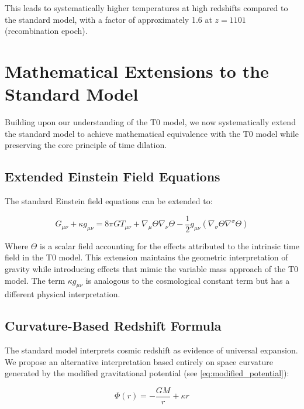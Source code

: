 \documentclass[12pt,a4paper]{article}
\begin{document}
	This leads to systematically higher temperatures at high redshifts compared to the standard model\cite{pascher_temp_2025}, with a factor of approximately 1.6 at $z = 1101$ (recombination epoch).
	
	\section{Mathematical Extensions to the Standard Model}
	\label{sec:mathematical_extensions}
	
	Building upon our understanding of the T0 model, we now systematically extend the standard model to achieve mathematical equivalence with the T0 model while preserving the core principle of time dilation.
	
	\subsection{Extended Einstein Field Equations}
	\label{subsec:extended_einstein}
	
	The standard Einstein field equations\cite{einstein1915} can be extended to:
	
	\begin{equation}
		\label{eq:extended_einstein}
		G_{\mu\nu} + \kappa g_{\mu\nu} = 8\pi G T_{\mu\nu} + \nabla_{\mu}\Theta\nabla_{\nu}\Theta - \frac{1}{2}g_{\mu\nu}(\nabla_{\sigma}\Theta\nabla^{\sigma}\Theta)
	\end{equation}
	
	Where $\Theta$ is a scalar field accounting for the effects attributed to the intrinsic time field in the T0 model\cite{pascher_lagrange_2025}. This extension maintains the geometric interpretation of gravity while introducing effects that mimic the variable mass approach of the T0 model. The term $\kappa g_{\mu\nu}$ is analogous to the cosmological constant term but has a different physical interpretation\cite{pascher_emergente_gravitation_2025}.
	
	\subsection{Curvature-Based Redshift Formula}
	\label{subsec:curvature_redshift}
	
	The standard model interprets cosmic redshift as evidence of universal expansion. We propose an alternative interpretation based entirely on space curvature generated by the modified gravitational potential (see \cref{eq:modified_potential}):
	
	\begin{equation}
		\Phi(r) = -\frac{GM}{r} + \kappa r
	\end{equation}
	
\end{document}
